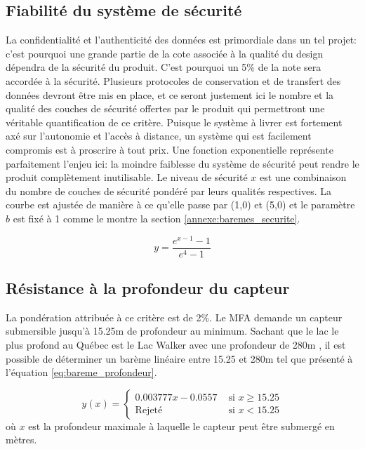 \subsection{Fiabilité du système de sécurité}


La confidentialité et l'authenticité des données est primordiale dans un tel projet: c'est pourquoi une grande partie de la cote associée à la qualité du design dépendra de la sécurité du produit. C'est pourquoi un 5\% de la note sera accordée à la sécurité. Plusieurs protocoles de conservation et de transfert des données devront être mis en place, et ce seront justement ici le nombre et la qualité des couches de sécurité offertes par le produit qui permettront une véritable quantification de ce critère. Puisque le système à livrer est fortement axé sur l'autonomie et l'accès à distance, un système qui est facilement compromis est à proscrire à tout prix. Une fonction exponentielle représente parfaitement l'enjeu ici: la moindre faiblesse du système de sécurité peut rendre le produit complètement inutilisable. Le niveau de sécurité $x$ est une combinaison du nombre de couches de sécurité pondéré par leurs qualités respectives. La courbe est ajustée de manière à ce qu'elle passe par (1,0) et (5,0) et le paramètre $b$ est fixé à 1 comme le montre la section \ref{annexe:baremes_securite}.

\begin{equation}
    y =\frac{e^{x-1}-1}{e^4-1}
    \label{eq:bareme_sécurité}
\end{equation}

\subsection{Résistance à la profondeur du capteur}

La pondération attribuée à ce critère est de 2\%. Le MFA demande un capteur submersible jusqu'à 15.25m de profondeur au minimum. Sachant que le lac le plus profond au Québec est le Lac Walker avec une profondeur de 280m \cite{Lac_walker}, il est possible de déterminer un barème linéaire entre 15.25 et 280m tel que présenté à l'équation \ref{eq:bareme_profondeur}.

\begin{equation}
y(x) = \begin{cases}
        0.003777x-0.0557 & \text{ si } x \geq 15.25\\
        \text{Rejeté} & \text{ si } x < 15.25
    \end{cases}
    \label{eq:bareme_profondeur}
\end{equation}
où $x$ est la profondeur maximale à laquelle le capteur peut être submergé en mètres.

